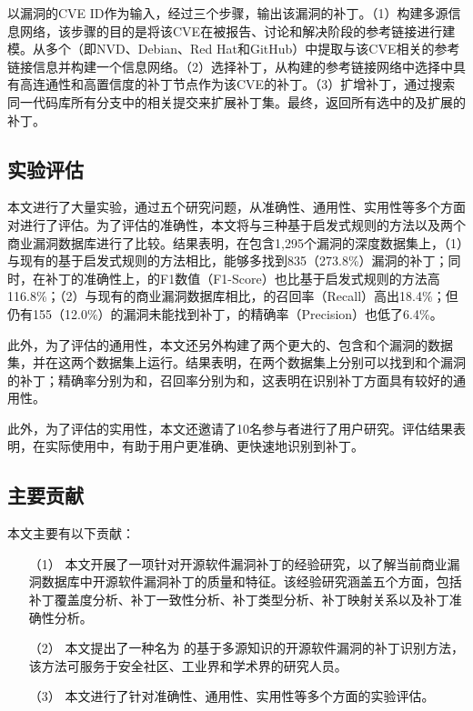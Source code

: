 \tool 以漏洞的CVE ID作为输入，经过三个步骤，输出该漏洞的补丁。（1）构建多源信息网络，该步骤的目的是将该CVE在被报告、讨论和解决阶段的参考链接进行建模。\tool 从多个（即NVD、Debian、Red Hat和GitHub）中提取与该CVE相关的参考链接信息并构建一个信息网络。（2）选择补丁，\tool 从构建的参考链接网络中选择中具有高连通性和高置信度的补丁节点作为该CVE的补丁。（3）扩增补丁，\tool 通过搜索同一代码库所有分支中的相关提交来扩展补丁集。最终，返回所有选中的及扩展的补丁。

\subsection{实验评估}
本文进行了大量实验，通过五个研究问题，从准确性、通用性、实用性等多个方面对\tool 进行了评估。为了评估\tool 的准确性，本文将\tool 与三种基于启发式规则的方法以及两个商业漏洞数据库进行了比较。结果表明，在包含1,295个漏洞的深度数据集上，（1）与现有的基于启发式规则的方法相比，\tool 能够多找到835（273.8\%）漏洞的补丁；同时，在补丁的准确性上，\tool 的F1数值（F1-Score）也比基于启发式规则的方法高116.8\%；（2）与现有的商业漏洞数据库相比，\tool 的召回率（Recall）高出18.4\%；但仍有155（12.0\%）的漏洞\tool 未能找到补丁，\tool 的精确率（Precision）也低了6.4\%。%

此外，为了评估\tool 的通用性，本文还另外构建了两个更大的、包含和个漏洞的数据集，并在这两个数据集上运行\tool 。结果表明，\tool 在两个数据集上分别可以找到和个漏洞的补丁；精确率分别为和，召回率分别为和，这表明\tool 在识别补丁方面具有较好的通用性。

此外，为了评估\tool 的实用性，本文还邀请了10名参与者进行了用户研究。评估结果表明，在实际使用中，\tool 有助于用户更准确、更快速地识别到补丁。

\subsection{主要贡献}
本文主要有以下贡献：
\begin{enumerate}
\item [（1）]本文开展了一项针对开源软件漏洞补丁的经验研究，以了解当前商业漏洞数据库中开源软件漏洞补丁的质量和特征。该经验研究涵盖五个方面，包括补丁覆盖度分析、补丁一致性分析、补丁类型分析、补丁映射关系以及补丁准确性分析。
\item [（2）]本文提出了一种名为 \tool 的基于多源知识的开源软件漏洞的补丁识别方法，该方法可服务于安全社区、工业界和学术界的研究人员。
\item [（3）]本文进行了针对\tool 准确性、通用性、实用性等多个方面的实验评估。
\end{enumerate}


